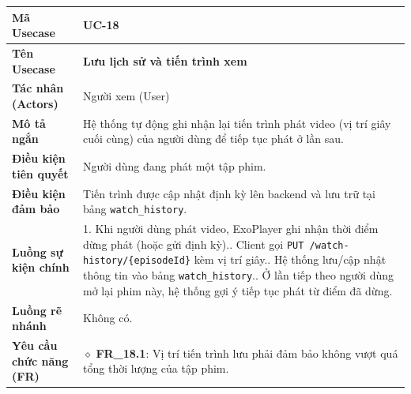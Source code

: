 \begin{table}[H]
\renewcommand{\arraystretch}{1.3}
\centering
\begin{tabularx}{\textwidth}{|p{4.5cm}|X|}
\hline
\cellcolor{gray!15}\bfseries Mã Usecase & \textbf{UC-18} \\ \hline
\cellcolor{gray!15}\bfseries Tên Usecase & \textbf{Lưu lịch sử và tiến trình xem} \\ \hline
\cellcolor{gray!15}\bfseries Tác nhân (Actors) & Người xem (User) \\ \hline
\cellcolor{gray!15}\bfseries Mô tả ngắn & Hệ thống tự động ghi nhận lại tiến trình phát video (vị trí giây cuối cùng) của người dùng để tiếp tục phát ở lần sau. \\ \hline
\cellcolor{gray!15}\bfseries Điều kiện tiên quyết & Người dùng đang phát một tập phim. \\ \hline
\cellcolor{gray!15}\bfseries Điều kiện đảm bảo & Tiến trình được cập nhật định kỳ lên backend và lưu trữ tại bảng \texttt{watch\_history}. \\ \hline
\cellcolor{gray!15}\bfseries Luồng sự kiện chính & 1. Khi người dùng phát video, ExoPlayer ghi nhận thời điểm dừng phát (hoặc gửi định kỳ).\newline 2. Client gọi \texttt{PUT /watch-history/\{episodeId\}} kèm vị trí giây.\newline 3. Hệ thống lưu/cập nhật thông tin vào bảng \texttt{watch\_history}.\newline 4. Ở lần tiếp theo người dùng mở lại phim này, hệ thống gợi ý tiếp tục phát từ điểm đã dừng. \\ \hline
\cellcolor{gray!15}\bfseries Luồng rẽ nhánh & Không có. \\ \hline
\cellcolor{gray!15}\bfseries Yêu cầu chức năng (FR) & $\diamond$ \textbf{FR\_18.1}: Vị trí tiến trình lưu phải đảm bảo không vượt quá tổng thời lượng của tập phim. \\ \hline
\end{tabularx}
\end{table}

